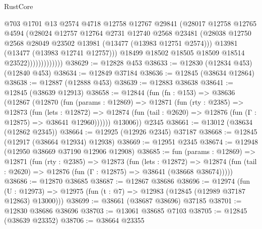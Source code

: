 \begin{lexlean}{RustCore}
\begin{coremodule}
                            @703
                            @1701
                            @13
                            @2574
                            @4718
                            @12758
                            @12767
                            @29841
                            (@28017
                              @12758
                              @12765
                              @4594
                              (@28024
                                @12757
                                @12764
                                @2731
                                @12740
                                @2568
                                @23481
                                (@28038
                                  @12750
                                  @2568
                                  @28049
                                  @23502
                                  @13981
                                  (@13477 (@13983 @12751 @2574)))
                                @13981
                                (@13477 (@13983 @12741 @12757)))
                              @18499
                              @18502
                              @18505
                              @18509
                              @18514
                              @23522)))))))))))))
@38629 := @12828 @453
@38633 := @12830 (@12834 @453) (@12840 @453)
@38634 := @12849 @37184
@38636 := @12845 (@38634 @12864)
@38638 := @12887 (@12888 @453)
@38639 := @12883 @38638
@38641 := @12845 (@38639 @12913)
@38658 := @12844
    (fun (fn : @153) =>
    @38636
      (@12867
        (@12870
          (fun (params : @12869) =>
          @12871
            (fun (rty : @2385) =>
            @12873
              (fun (lets : @12872) =>
              @12874 (fun (tail : @2620) => @12876 (fun (Γ : @12875) => @38641 @12960))))))
        @13006))
    @2345
@38661 := @13012 (@38634 (@12862 @2345))
@38664 := @12925 (@12926 @2345) @37187
@38668 := @12845 (@12917 (@38664 @12934) @12938)
@38669 := @12951 @2345
@38674 := @12948 (@12950 @38669 @37190 @12906 @12908)
@38685 := fun (params : @12869) =>
  @12871
    (fun (rty : @2385) =>
    @12873
      (fun (lets : @12872) =>
      @12874 (fun (tail : @2620) => @12876 (fun (Γ : @12875) => @38641 (@38668 @38674)))))
@38686 := @12870 @38685
@38687 := @12867 @38686
@38696 := @12974
    (fun (U : @12973) => @12975 (fun (t : @7) => @12983 (@12845 (@12989 @37187 @12863) @13000)))
@38699 := @38661 (@38687 @38696) @37185
@38701 := @12830 @38686 @38696
@38703 := @13061 @38685 @7103
@38705 := @12845 (@38639 @23352)
@38706 := @38664 @23355

\end{coremodule}
\end{lexlean}
